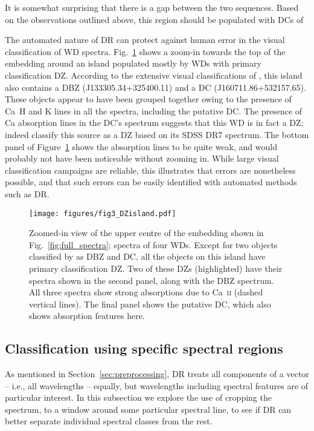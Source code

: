 \documentclass[fleqn,usenatbib]{mnras}
\begin{document}
It is somewhat surprising that there is a gap between the two sequences.
Based on the observations outlined above, this region should be populated with DCs of 

The automated nature of DR can protect against human error in the visual classification of WD spectra.
Fig.~\ref{fig:DZisland} shows a zoom-in towards the top of the embedding around an island populated mostly by WDs with primary classification DZ.
According to the extensive visual classifications of \citet{manser24}, this island also contains a DBZ (J133305.34+325400.11) and a DC (J160711.86+532157.65).
These objects appear to have been grouped together owing to the presence of Ca~H and K lines in all the spectra, including the putative DC.
The presence of Ca absorption lines in the DC's spectrum suggests that this WD is in fact a DZ; indeed \citet{kleinman13} classify this source as a DZ based on its SDSS DR7 spectrum.
The bottom panel of Figure~\ref{fig:DZisland} shows the absorption lines to be quite weak, and would probably not have been noticeable without zooming in.
While large visual classification campaigns are reliable, this illustrates that errors are nonetheless possible, and that such errors can be easily identified with automated methods such as DR.

\begin{figure}
\texttt{[image: figures/fig3\_DZisland.pdf]}
\caption{
    Zoomed-in view of the upper centre of the embedding shown in Fig.~\ref{fig:full_spectra}; spectra of four WDs.
    Except for two objects classified by \citet{manser24} as DBZ and DC, all the objects on this island have primary classification DZ.
    Two of these DZs (highlighted) have their spectra shown in the second panel, along with the DBZ spectrum.
    All three spectra show strong absorptions due to Ca~\textsc{ii} (dashed vertical lines).
    The final panel shows the putative DC, which also shows absorption features here.
}
\label{fig:DZisland}
\end{figure}

\subsection{Classification using specific spectral regions}
\label{sec:zoom}

As mentioned in Section~\ref{sec:preprocessing}, DR treats all components of a vector -- i.e., all wavelengths -- equally, but wavelengths including spectral features are of particular interest.
In this subsection we explore the use of cropping the spectrum, to a window around some particular spectral line, to see if DR can better separate individual spectral classes from the rest.
\end{document}
